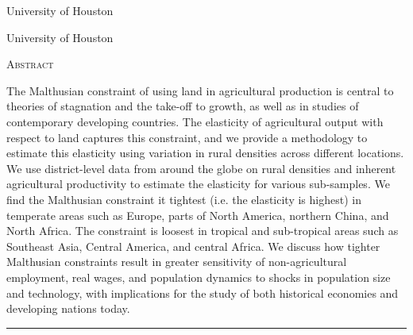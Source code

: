\documentclass[11pt]{article}
\begin{document}
\begin{titlepage}
\vspace{2in} \noindent {\large \today}

\vspace{.5in} 

\vspace{.25in} 

\vspace{.05in} \noindent University of Houston

\vspace{.25in} 

\vspace{.05in} \noindent University of Houston

\vfill \noindent \textsc{Abstract} \hrulefill

\vspace{.05in} \noindent The Malthusian constraint of using land in agricultural production is central to theories of stagnation and the take-off to growth, as well as in studies of contemporary developing countries. The elasticity of agricultural output with respect to land captures this constraint, and we provide a methodology to estimate this elasticity using variation in rural densities across different locations. We use district-level data from around the globe on rural densities and inherent agricultural productivity to estimate the elasticity for various sub-samples. We find the Malthusian constraint it tightest (i.e. the elasticity is highest) in temperate areas such as Europe, parts of North America, northern China, and North Africa. The constraint is loosest in tropical and sub-tropical areas such as Southeast Asia, Central America, and central Africa. We discuss how tighter Malthusian constraints result in greater sensitivity of non-agricultural employment, real wages, and population dynamics to shocks in population size and technology, with implications for the study of both historical economies and developing nations today.

\vspace{.1in} \hrule

\vspace{.5in} 

\vspace{.1in} 

\vspace{.1in} 
\end{titlepage}
\end{document}
